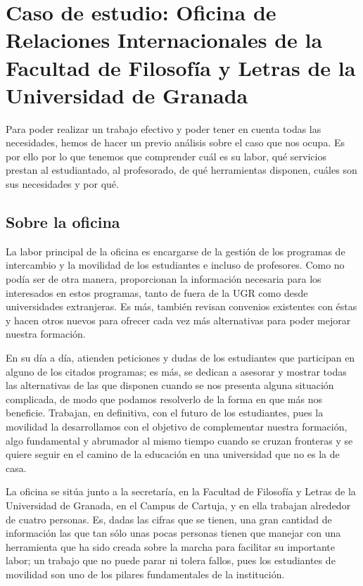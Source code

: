 \chapter{Caso de estudio: Oficina de Relaciones Internacionales de la Facultad de Filosofía y Letras de la Universidad de Granada}

Para poder realizar un trabajo efectivo y poder tener en cuenta todas las necesidades, hemos de hacer un previo análisis sobre el caso que nos ocupa. Es por ello por lo que tenemos que comprender cuál es su labor, qué servicios prestan al estudiantado, al profesorado, de qué herramientas disponen, cuáles son sus necesidades y por qué.

\section{Sobre la oficina}
La labor principal de la oficina es encargarse de la gestión de los programas de intercambio y la movilidad de los estudiantes e incluso de profesores. Como no podía ser de otra manera, proporcionan la información necesaria para los interesados en estos programas, tanto de fuera de la UGR como desde universidades extranjeras. Es más, también revisan convenios existentes con éstas y hacen otros nuevos para ofrecer cada vez más alternativas para poder mejorar nuestra formación.

En su día a día, atienden peticiones y dudas de los estudiantes que participan en alguno de los citados programas; es más, se dedican a asesorar y mostrar todas las alternativas de las que disponen cuando se nos presenta alguna situación complicada, de modo que podamos resolverlo de la forma en que más nos beneficie. Trabajan, en definitiva, con el futuro de los estudiantes, pues la movilidad la desarrollamos con el objetivo de complementar nuestra formación, algo fundamental y abrumador al mismo tiempo cuando se cruzan fronteras y se quiere seguir en el camino de la educación en una universidad que no es la de casa.

La oficina se sitúa junto a la secretaría, en la Facultad de Filosofía y Letras de la Universidad de Granada, en el Campus de Cartuja, y en ella trabajan alrededor de cuatro personas. Es, dadas las cifras que se tienen, una gran cantidad de información las que tan sólo unas pocas personas tienen que manejar con una herramienta que ha sido creada sobre la marcha para facilitar su importante labor; un trabajo que no puede parar ni tolera fallos, pues los estudiantes de movilidad son uno de los pilares fundamentales de la institución.

